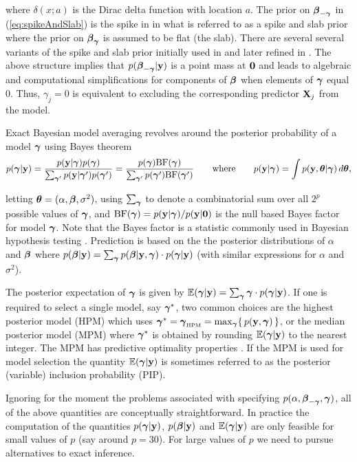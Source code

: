 \documentclass{article}[12pt]
\begin{document}
\noindent where $\delta(x;a)$ is the Dirac delta function with location $a$.  
The prior on ${\boldsymbol \beta}_{-{\boldsymbol \gamma}}$ in (\ref{eq:spikeAndSlab}) is the spike in
in what is referred to as a spike and slab prior where the prior on ${\boldsymbol \beta}_{{\boldsymbol \gamma}}$ is assumed to be flat (the slab). There are several
several variants of the spike and slab prior initially used in
\cite{Mitchell1988}
and later refined in
\cite{George1993}. 
The above structure implies 
that $p({\boldsymbol \beta}_{-{\boldsymbol \gamma}}|{\bf y})$ is a point mass at ${\bf 0}$
and leads to
algebraic and computational simplifications for components of ${\boldsymbol \beta}$ when elements of ${\boldsymbol \gamma}$ equal 0.
Thus, $\gamma_j=0$ is equivalent to excluding the corresponding predictor ${\bf X}_j$ from the model.


Exact Bayesian model averaging revolves around the posterior
 probability of a model ${\boldsymbol \gamma}$ using Bayes theorem
$$
\displaystyle p({\boldsymbol \gamma}|{\bf y}) = \frac{p({\bf y}|{\boldsymbol \gamma})p({\boldsymbol \gamma})}{\sum_{{\boldsymbol \gamma}'} p({\bf y}|{\boldsymbol \gamma}')p({\boldsymbol \gamma}')} = \frac{p({\boldsymbol \gamma})\mbox{BF}({\boldsymbol \gamma})}{\sum_{{\boldsymbol \gamma}'} p({\boldsymbol \gamma}')\mbox{BF}({\boldsymbol \gamma}')}
\qquad \mbox{where} \qquad 
p({\bf y}|{\boldsymbol \gamma}) = \int p({\bf y},{\boldsymbol \theta}|{\boldsymbol \gamma}) \, d{\boldsymbol \theta},
$$

\noindent letting ${\boldsymbol \theta} = (\alpha,{\boldsymbol \beta},\sigma^2)$, using $\sum_{{\boldsymbol \gamma}}$ to denote a combinatorial sum over all
$2^p$ possible values of ${\boldsymbol \gamma}$, and $\mbox{BF}({\boldsymbol \gamma}) = p({\bf y}|{\boldsymbol \gamma})/p({\bf y}|{\bf 0})$
is the null based Bayes factor for model ${\boldsymbol \gamma}$.
Note that the Bayes factor is a statistic commonly used in Bayesian hypothesis testing 
\cite{Kass1995,OrmerodEtal2017}.
Prediction is based on the 
the posterior distributions of $\alpha$ and ${\boldsymbol \beta}$ where
$p({\boldsymbol \beta}|{\bf y}) = \sum_{{\boldsymbol \gamma}} p({\boldsymbol \beta}|{\bf y},{\boldsymbol \gamma}) \cdot p({\boldsymbol \gamma}|{\bf y})$
(with similar expressions for $\alpha$ and $\sigma^2$).

The 
posterior expectation of ${\boldsymbol \gamma}$ is given by
${\mathbb E}({\boldsymbol \gamma}|{\bf y}) = \sum_{{\boldsymbol \gamma}} {\boldsymbol \gamma} \cdot p({\boldsymbol \gamma}|{\bf y})$.
If one is required to select a single model, say ${\boldsymbol \gamma}^*$, two common choices are the 
highest posterior model (HPM) which uses ${\boldsymbol \gamma}^* = {\boldsymbol \gamma}_{\mbox{\tiny HPM}} = \max_{\boldsymbol \gamma} \{ \, p({\bf y},{\boldsymbol \gamma}) \, \}$, or the
median posterior model (MPM) where ${\boldsymbol \gamma}^*$ is obtained by
rounding ${\mathbb E}({\boldsymbol \gamma}|{\bf y})$ to the nearest integer.
The MPM has predictive optimality properties \cite{barbieri2004}.
If the MPM is used for model selection
the quantity ${\mathbb E}({\boldsymbol \gamma}|{\bf y})$ is sometimes referred to as the
posterior (variable) inclusion probability (PIP).

Ignoring for the moment the problems associated with specifying
$p(\alpha,{\boldsymbol \beta}_{-{\boldsymbol \gamma}},{\boldsymbol \gamma})$, all of the above quantities are conceptually
straightforward. In practice the computation of the quantities $p({\boldsymbol \gamma}|{\bf y})$, $p({\boldsymbol \beta}|{\bf y})$ and 
${\mathbb E}({\boldsymbol \gamma}|{\bf y})$ are only feasible for small values of $p$ (say around $p=30$). For large values of $p$ we need to pursue
alternatives to exact inference.
\end{document}
